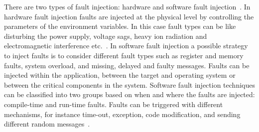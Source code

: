There are two types of fault injection: hardware and software fault injection~\cite{rana2013improving}. 
In hardware fault injection  faults are injected at the physical level by controlling the parameters of the environment variables. In this case fault types can be like disturbing the power supply, voltage sags, heavy ion radiation and electromagnetic interference etc.~\cite{rana2013improving}. 
In software fault injection a possible strategy to inject faults is to consider %
different fault types such as register and memory faults, system overload, and missing, delayed and faulty  messages. Faults can be injected within the application, between the target and operating system or between the critical components in the system. 
Software fault injection techniques can be classified into two groups based on when and where the faults are injected: %
compile-time and run-time faults. 
Faults can be triggered with different mechanisms, for instance time-out, exception, code modification, and sending different random messages~\cite{rana2013improving}.   


